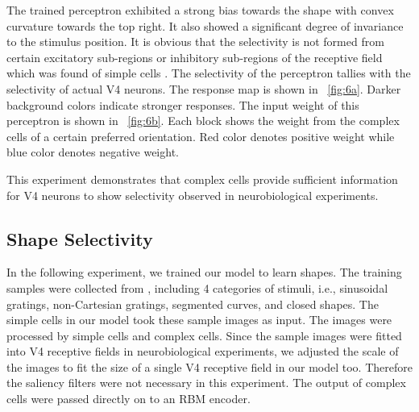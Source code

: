 \documentclass[conference]{IEEEtran}
\begin{document}
The trained perceptron exhibited a strong bias towards the shape with convex curvature towards the top right.
It also showed a significant degree of invariance to the stimulus position.
It is obvious that the selectivity is not formed from certain excitatory sub-regions
or inhibitory sub-regions of the receptive field which was found of simple cells \cite{hubel1962,pasupathy2001}.
The selectivity of the perceptron tallies with the selectivity of actual V4 neurons.
The response map is shown in \figurename~\ref{fig:6a}.
Darker background colors indicate stronger responses.
The input weight of this perceptron is shown in \figurename~\ref{fig:6b}.
Each block shows the weight from the complex cells of a certain preferred orientation.
Red color denotes positive weight while blue color denotes negative weight.

This experiment demonstrates that complex cells provide sufficient information
for V4 neurons to show selectivity observed in neurobiological experiments.

\subsection{Shape Selectivity}

In the following experiment, we trained our model to learn shapes.
The training samples were collected from \cite{gallant1996,pasupathy1999,pasupathy2001}, 
including 4 categories of stimuli, i.e.,
sinusoidal gratings, non-Cartesian gratings, segmented curves, and closed shapes.
The simple cells in our model took these sample images as input.
The images were processed by simple cells and complex cells.
Since the sample images were fitted into V4 receptive fields in neurobiological experiments,
we adjusted the scale of the images to fit the size of a single V4 receptive field in our model too.
Therefore the saliency filters were not necessary in this experiment.
The output of complex cells were passed directly on to an RBM encoder.
\end{document}
